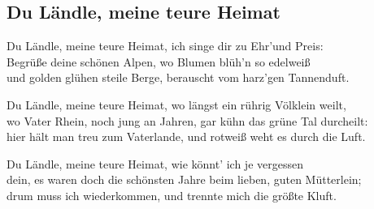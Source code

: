 
\subsection*{Du Ländle, meine teure Heimat}
%
%

\thestrophe Du Ländle, meine teure Heimat, ich singe dir zu Ehr'und Preis: \\
Begrüße deine schönen Alpen, wo Blumen blüh'n so edelweiß \\
und golden glühen steile Berge, berauscht vom harz'gen Tannenduft. \\

\thestrophe Du Ländle, meine teure Heimat, wo längst ein rührig Völklein weilt, \\
wo Vater Rhein, noch jung an Jahren, gar kühn das grüne Tal durcheilt: \\
hier hält man treu zum Vaterlande, und rotweiß weht es durch die Luft. \\

\thestrophe Du Ländle, meine teure Heimat, wie könnt' ich je vergessen \\
dein, es waren doch die schönsten Jahre beim lieben, guten Mütterlein; \\
drum muss ich wiederkommen, und trennte mich die größte Kluft. \\
